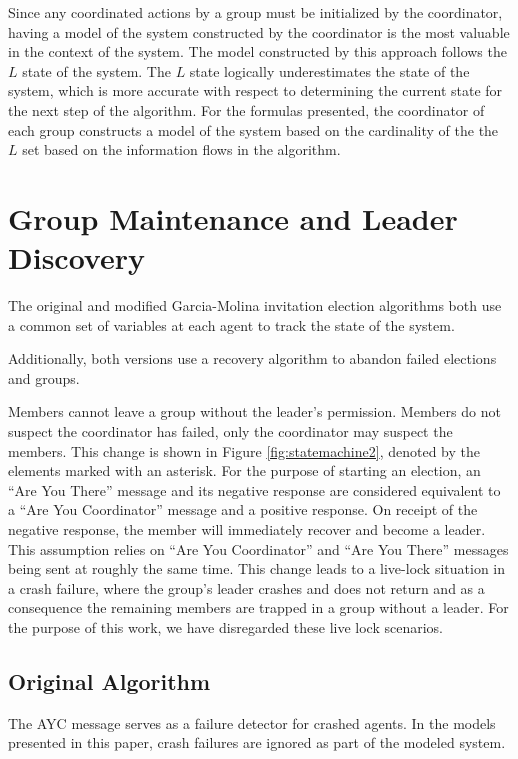 Since any coordinated actions by a group must be initialized by the coordinator, having a model of the system constructed by the coordinator is the most valuable in the context of the system. The model constructed by this approach follows the $L$ state of the system. The $L$ state logically underestimates the state of the system, which is more accurate with respect to determining the current state for the next step of the algorithm. For the formulas presented, the coordinator of each group constructs a model of the system based on the cardinality of the the $L$ set based on the information flows in the algorithm.

\section{Group Maintenance and Leader Discovery}

The original and modified Garcia-Molina invitation election algorithms both use a common set of variables at each agent to track the state of the system.

Additionally, both versions use a recovery algorithm to abandon failed elections and groups.

Members cannot leave a group without the leader's permission.
Members do not suspect the coordinator has failed, only the coordinator may suspect the members.
This change is shown in Figure \ref{fig:statemachine2}, denoted by the elements marked with an asterisk.
For the purpose of starting an election, an ``Are You There'' message and its negative response are considered equivalent to a ``Are You Coordinator'' message and a positive response.
On receipt of the negative response, the member will immediately recover and become a leader.
This assumption relies on ``Are You Coordinator'' and ``Are You There'' messages being sent at roughly the same time.
This change leads to a live-lock situation in a crash failure, where the group's leader crashes and does not return and as a consequence the remaining members are trapped in a group without a leader.
For the purpose of this work, we have disregarded these live lock scenarios.

\subsection{Original Algorithm}

The \ac{AYC} message serves as a failure detector for crashed agents. In the models presented in this paper, crash failures are ignored as part of the modeled system.

